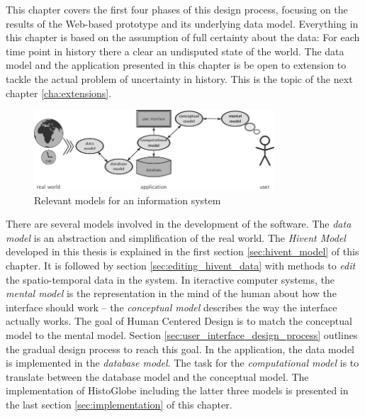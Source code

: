 This chapter covers the first four phases of this design process, focusing on the results of the Web-based prototype and its underlying data model. Everything in this chapter is based on the assumption of full certainty about the data: For each time point in history there a clear an undisputed state of the world. The data model and the application presented in this chapter is be open to extension to tackle the actual problem of uncertainty in history. This is the topic of the next chapter \ref{cha:extensions}.

\begin{figure}[H]
  \vspace{1.5em}
  \centering
  \includegraphics[width=0.8\textwidth]{graphics/development/models}
  \caption{Relevant models for an information system}
  \label{fig:models}
\end{figure}

There are several models involved in the development of the software. The \emph{data model} is an abstraction and simplification of the real world. The \emph{Hivent Model} developed in this thesis is explained in the first section \ref{sec:hivent_model} of this chapter. It is followed by section \ref{sec:editing_hivent_data} with methods to \emph{edit} the spatio-temporal data in the system. In iteractive computer systems, the \emph{mental model} is the representation in the mind of the human about how the interface should work -- the \emph{conceptual model} describes the way the interface actually works. The goal of Human Centered Design is to match the conceptual model to the mental model. Section \ref{sec:user_interface_design_process} outlines the gradual design process to reach this goal. In the application, the data model is implemented in the \emph{database model}. The task for the \emph{computational model} is to translate between the database model and the conceptual model. The implementation of HistoGlobe including the latter three models is presented in the last section \ref{sec:implementation} of this chapter.

\newpage





